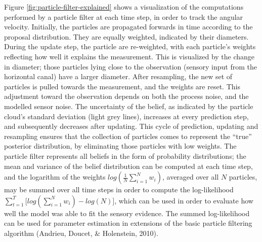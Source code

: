 \documentclass[english,floatsintext,man]{apa6}
\theoremstyle{definition}
\theoremstyle{definition}
\theoremstyle{remark}
\begin{document}
Figure \ref{fig:particle-filter-explained} shows a visualization of the
computations performed by a particle filter at each time step, in order
to track the angular velocity. Initially, the particles are propagated
forwards in time according to the proposal distribution. They are
equally weighted, indicated by their diameters. During the update step,
the particle are re-weighted, with each particle's weights reflecting
how well it explains the measurement. This is visualized by the change
in diameter; those particles lying close to the observation (sensory
input from the horizontal canal) have a larger diameter. After
resampling, the new set of particles is pulled towards the measurement,
and the weights are reset. This adjustment toward the observation
depends on both the process noise, and the modelled sensor noise. The
uncertainty of the belief, as indicated by the particle cloud's standard
deviation (light grey lines), increases at every prediction step, and
subsequently decreases after updating. This cycle of prediction,
updating and resampling ensures that the collection of particles comes
to represent the \enquote{true} posterior distribution, by eliminating
those particles with low weights. The particle filter represents all
beliefs in the form of probability distributions; the mean and variance
of the belief distribution can be computed at each time step, and the
logarithm of the weights \(log(\frac{1}{N}\sum^N_{i=1}w_i)\), averaged
over all \(N\) particles, may be summed over all time steps in order to
compute the log-likelihood
\(\sum^T_{t=1}\Big[log(\sum^N_{i=1}w_i) - log(N)\Big]\), which can be
used in order to evaluate how well the model was able to fit the sensory
evidence. The summed log-likelihood can be used for parameter estimation
in extensions of the basic particle filtering algorithm (Andrieu,
Doucet, \& Holenstein, 2010).
\end{document}
